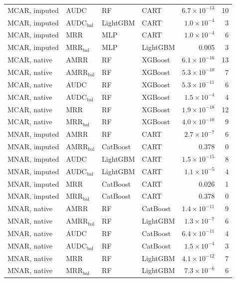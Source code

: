 \begin{table}[p]
\begin{tabular}{@{}llllrr@{}}
MCAR, imputed & AUDC & RF & CART & $6.7\times10^{-13}$ & 10 \\
MCAR, imputed & AUDC$_{\mathrm{bal}}$ & LightGBM & CART & $1.0\times10^{-4}$ & 3 \\
MCAR, imputed & MRR & MLP & CART & $1.0\times10^{-4}$ & 6 \\
MCAR, imputed & MRR$_{\mathrm{bal}}$ & MLP & LightGBM & 0.005 & 3 \\
MCAR, native & AMRR & RF & XGBoost & $6.1\times10^{-16}$ & 13 \\
MCAR, native & AMRR$_{\mathrm{bal}}$ & RF & XGBoost & $5.3\times10^{-10}$ & 7 \\
MCAR, native & AUDC & RF & XGBoost & $5.3\times10^{-11}$ & 6 \\
MCAR, native & AUDC$_{\mathrm{bal}}$ & RF & XGBoost & $1.5\times10^{-4}$ & 4 \\
MCAR, native & MRR & RF & XGBoost & $1.9\times10^{-18}$ & 12 \\
MCAR, native & MRR$_{\mathrm{bal}}$ & RF & XGBoost & $4.0\times10^{-10}$ & 9 \\
MNAR, imputed & AMRR & RF & CART & $2.7\times10^{-7}$ & 6 \\
MNAR, imputed & AMRR$_{\mathrm{bal}}$ & CatBoost & CART & 0.378 & 0 \\
MNAR, imputed & AUDC & LightGBM & CART & $1.5\times10^{-15}$ & 8 \\
MNAR, imputed & AUDC$_{\mathrm{bal}}$ & LightGBM & CART & $1.1\times10^{-5}$ & 4 \\
MNAR, imputed & MRR & CatBoost & CART & 0.026 & 1 \\
MNAR, imputed & MRR$_{\mathrm{bal}}$ & CatBoost & CART & 0.378 & 0 \\
MNAR, native & AMRR & RF & CatBoost & $1.4\times10^{-11}$ & 9 \\
MNAR, native & AMRR$_{\mathrm{bal}}$ & RF & LightGBM & $1.3\times10^{-7}$ & 6 \\
MNAR, native & AUDC & RF & CatBoost & $6.4\times10^{-11}$ & 4 \\
MNAR, native & AUDC$_{\mathrm{bal}}$ & RF & CatBoost & $1.5\times10^{-4}$ & 3 \\
MNAR, native & MRR & RF & LightGBM & $4.1\times10^{-12}$ & 7 \\
MNAR, native & MRR$_{\mathrm{bal}}$ & RF & LightGBM & $7.3\times10^{-6}$ & 6 \\
\bottomrule
\end{tabular}
\end{table}
